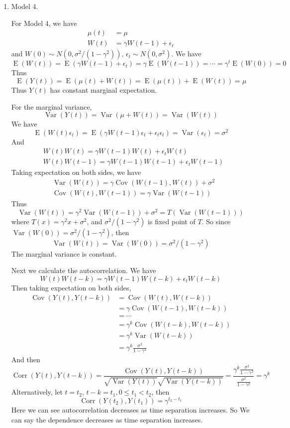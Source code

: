 \documentclass{article}
\DeclareMathOperator{\Corr}{Corr}
\DeclareMathOperator{\Cov}{Cov}
\DeclareMathOperator{\Var}{Var}
\DeclareMathOperator{\E}{E}
\begin{document}
\begin{enumerate}
	\item 
	Model 4.

	For Model 4, we have
	\begin{align*}
	\mu(t) &= \mu\\
	W(t) &= \gamma W(t-1) +\epsilon_t
	\end{align*}
	and $W(0) \sim N(0, \sigma^2/(1 - \gamma^2)),\, \epsilon_t \sim N(0, \sigma^2)$.
	We have
	\[\E(W(t)) = \E( \gamma W(t-1) + \epsilon_t) = \gamma \E(W(t-1)) = \cdots = \gamma^t \E(W(0)) = 0\]
	Thus
	\[\E(Y(t)) = \E(\mu(t) + W(t)) = \E(\mu(t)) + \E(W(t)) = \mu\]
	Thus $Y(t)$ has constant marginal expectation.

	For the marginal variance,
	\[\Var(Y(t)) = \Var(\mu +W(t)) = \Var(W(t))\]
	We have
	\[\E(W(t) \epsilon_t) = \E(\gamma W(t-1) \epsilon_t + \epsilon_t \epsilon_t) = \Var(\epsilon_t) = \sigma^2\]
	And
	\begin{align*}
	&W(t) W(t) = \gamma W(t-1) W(t) + \epsilon_t W(t)\\
	& W(t)W(t-1) = \gamma W(t-1) W(t-1) + \epsilon_t W(t-1)
	\end{align*}
	Taking expectation on both sides, we have
	\begin{align*}
	& \Var(W(t)) = \gamma \Cov(W(t-1), W(t)) + \sigma^2\\
	& \Cov(W(t), W(t-1)) = \gamma \Var(W(t-1))
	\end{align*}
	Thus
	\[\Var(W(t)) = \gamma^2 \Var(W(t-1)) + \sigma^2 = T(\Var(W(t-1)))\]
	where $T(x) = \gamma^2 x +\sigma^2$, and $\sigma^2/(1 - \gamma^2)$ is fixed point of $T$. So since $\Var(W(0)) = \sigma^2/(1 - \gamma^2)$, then
	\[\Var(W(t)) = \Var(W(0)) = \sigma^2/(1 - \gamma^2)\]
	The marginal variance is constant.

	Next we calculate the autocorrelation.
	We have
	\[W(t)W(t-k) = \gamma W(t-1) W(t-k) + \epsilon_t W(t-k)\]
	Then taking expectation on both sides,
	\begin{align*}
	\Cov(Y(t), Y(t - k)) & = \Cov(W(t), W(t-k))\\
	& = \gamma \Cov(W(t-1), W(t-k)) \\
	& = \cdots\\
	& = \gamma^k \Cov(W(t-k), W(t-k))\\
	& = \gamma^k \Var(W(t-k))\\
	& = \gamma^k \frac{\sigma^2}{1 - \gamma^2}
	\end{align*}
	And then 
	\[\Corr(Y(t), Y(t-k)) = \frac{\Cov(Y(t), Y(t-k))}{\sqrt{\Var(Y(t))} \sqrt{\Var(Y(t-k))}} = \frac{\gamma^k \frac{\sigma^2}{1 - \gamma^2}}{\frac{\sigma^2}{1 - \gamma^2}} = \gamma^k\]
	Alternatively, let $t = t_2,\, t - k = t_1, 0\leq t_1 < t_2$, then
	\[\Corr(Y(t_2), Y(t_1)) = \gamma^{t_2 - t_1}\]
	Here we can see autocorrelation decreases as time separation increases. So We can say the dependence decreases as time separation increases.
	
\end{enumerate}
\end{document}
